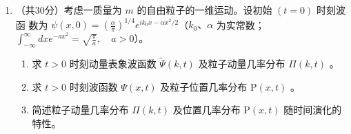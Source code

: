 \begin{enumerate}
{	
}

 	
\item 
（共30分）考虑一质量为 $m$ 的自由粒子的一维运动。设初始 $(t=0)$ 时刻波函
数为 $\psi(x, 0)=\left(\frac{\alpha}{\pi}\right)^{1 / 4} e^{i k_{0} x-\alpha x^{2} / 2} $（$k_{0} 、 \alpha$ 为实常数； $\int_{-\infty}^{\infty} d x e^{-a x^{2}}=\sqrt{\frac{\pi}{a}}, \quad a>0$）。
\begin{enumerate}
	\item
	求 $t>0$ 时刻动量表象波函数 $\tilde{\Psi}(k, t)$ 及粒子动量几率分布 $\Pi(k, t)$ 。
	\item 
	求 $t>0$ 时刻波函数 $\Psi(x, t)$ 及粒子位置几率分布 $\mathrm{P}(x, t)$ 。
	\item 
	简述粒子动量几率分布 $\Pi(k, t)$ 及位置几率分布 $\mathrm{P}(x, t)$ 随时间演化的特性。
	
	
	

\end{enumerate}
\end{enumerate}
